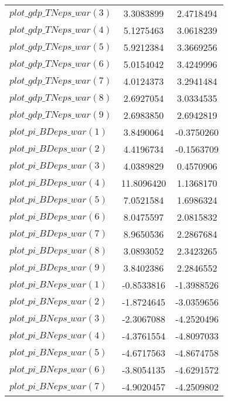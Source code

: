 \begin{center}
\begin{longtable}{lcc}
$plot\_gdp\_TN eps\_war (3)  $	 & 	      3.3083899	 & 	      2.4718494 \\ 
$plot\_gdp\_TN eps\_war (4)  $	 & 	      5.1275463	 & 	      3.0618239 \\ 
$plot\_gdp\_TN eps\_war (5)  $	 & 	      5.9212384	 & 	      3.3669256 \\ 
$plot\_gdp\_TN eps\_war (6)  $	 & 	      5.0154042	 & 	      3.4249996 \\ 
$plot\_gdp\_TN eps\_war (7)  $	 & 	      4.0124373	 & 	      3.2941484 \\ 
$plot\_gdp\_TN eps\_war (8)  $	 & 	      2.6927054	 & 	      3.0334535 \\ 
$plot\_gdp\_TN eps\_war (9)  $	 & 	      2.6983850	 & 	      2.6942819 \\ 
$plot\_pi\_BD eps\_war (1)   $	 & 	      3.8490064	 & 	     -0.3750260 \\ 
$plot\_pi\_BD eps\_war (2)   $	 & 	      4.4196734	 & 	     -0.1563709 \\ 
$plot\_pi\_BD eps\_war (3)   $	 & 	      4.0389829	 & 	      0.4570906 \\ 
$plot\_pi\_BD eps\_war (4)   $	 & 	     11.8096420	 & 	      1.1368170 \\ 
$plot\_pi\_BD eps\_war (5)   $	 & 	      7.0521584	 & 	      1.6986324 \\ 
$plot\_pi\_BD eps\_war (6)   $	 & 	      8.0475597	 & 	      2.0815832 \\ 
$plot\_pi\_BD eps\_war (7)   $	 & 	      8.9650536	 & 	      2.2867684 \\ 
$plot\_pi\_BD eps\_war (8)   $	 & 	      3.0893052	 & 	      2.3423265 \\ 
$plot\_pi\_BD eps\_war (9)   $	 & 	      3.8402386	 & 	      2.2846552 \\ 
$plot\_pi\_BN eps\_war (1)   $	 & 	     -0.8533816	 & 	     -1.3988526 \\ 
$plot\_pi\_BN eps\_war (2)   $	 & 	     -1.8724645	 & 	     -3.0359656 \\ 
$plot\_pi\_BN eps\_war (3)   $	 & 	     -2.3067088	 & 	     -4.2520496 \\ 
$plot\_pi\_BN eps\_war (4)   $	 & 	     -4.3761554	 & 	     -4.8097033 \\ 
$plot\_pi\_BN eps\_war (5)   $	 & 	     -4.6717563	 & 	     -4.8674758 \\ 
$plot\_pi\_BN eps\_war (6)   $	 & 	     -3.8054135	 & 	     -4.6291572 \\ 
$plot\_pi\_BN eps\_war (7)   $	 & 	     -4.9020457	 & 	     -4.2509802 \\ 

\end{longtable}
\end{center}

